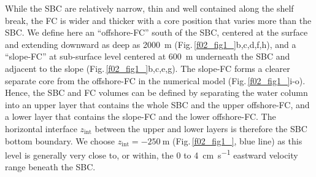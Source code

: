 \documentclass[preprint,3p,review,12pt]{elsarticle}
\newcommand{\sub}[1]{_{\text{#1}}}
\begin{document}
While the SBC are relatively narrow, thin and well contained along the shelf break, the FC is wider and thicker with a core position that varies more than the SBC\@. We define here an \enquote{offshore-FC}
south of the SBC, centered at the surface and extending downward as deep as \SI{2000}{\meter} (Fig.\,\ref{f02_fig1_}b,c,d,f,h), and
a \enquote{slope-FC} at sub-surface level centered at \SI{600}{\meter} underneath the SBC and adjacent to the slope (Fig.\,\ref{f02_fig1_}b,c,e,g). The slope-FC forms a clearer separate core from the offshore-FC in the numerical model (Fig.\,\ref{f02_fig1_}i-o).
Hence, the SBC and FC volumes can be defined by separating the water column into an upper layer that contains the whole SBC and the upper offshore-FC, and a lower layer that contains the slope-FC and the lower offshore-FC\@. The horizontal interface $z\sub{int}$ between the upper and lower layers is therefore the SBC bottom boundary. We choose $z\sub{int} = \SI{-250}{\meter}$ (Fig.\,\ref{f02_fig1_}, blue line) as this level is generally very close to, or within, the \num{0} to \SI{4}{\centi\meter\per\second} eastward velocity range beneath the SBC.
%
\end{document}
